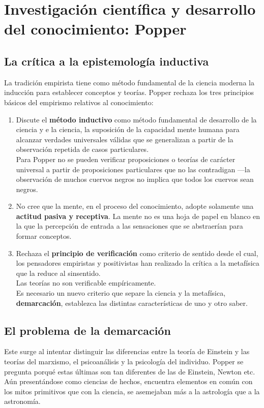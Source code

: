 \documentclass[a4paper, 11pt, twocolumn, spanish]{article}
\begin{document}
\section{Investigación científica y desarrollo del conocimiento: Popper}
\label{sec:orgcca902f}
\subsection{La crítica a la epistemología inductiva}
\label{sec:orgc7d0be8}
La tradición empirista tiene como método fundamental de la ciencia
moderna la inducción para establecer conceptos y teorías. Popper
rechaza los tres principios básicos del empirismo relativos al
conocimiento:
\begin{enumerate}
\item Discute el \textbf{método inductivo} como método fundamental de desarrollo
de la ciencia y e la ciencia, la suposición de la capacidad mente
humana para alcanzar verdades universales válidas que se
generalizan a partir de la observación repetida de casos
particulares.\\[0pt]
Para Popper no se pueden verificar proposiciones o teorías de
carácter universal a partir de proposiciones particulares que no
las contradigan —la observación de muchos cuervos negros no
implica que todos los cuervos sean negros.
\item No cree que la mente, en el proceso del conocimiento, adopte
solamente una \textbf{actitud pasiva y receptiva}. La mente no es una hoja
de papel en blanco en la que la percepción de entrada a las
sensaciones que se abstraerían para formar conceptos.
\item Rechaza el \textbf{principio de verificación} como criterio de sentido
desde el cual, los pensadores empiristas y positivistas han
realizado la crítica a la metafísica que la reduce al
sinsentido.\\[0pt]
Las teorías no son verificable empíricamente.\\[0pt]
Es necesario un nuevo criterio que separe la ciencia y la
metafísica, \textbf{demarcación}, establezca las distintas características de uno y
otro saber.
\end{enumerate}

\subsection{El problema de la demarcación}
\label{sec:org809ba3a}
Este surge al intentar distinguir las diferencias entre la teoría de
Einstein y las teorías del marxismo, el psicoanálisis y la psicología
del individuo. Popper se pregunta porqué estas últimas son tan
diferentes de las de Einstein, Newton etc. Aún presentándose como
ciencias de hechos, encuentra elementos en común con los mitos
primitivos que con la ciencia, se asemejaban más a la astrología que a
la astronomía.\\[0pt]
\end{document}
